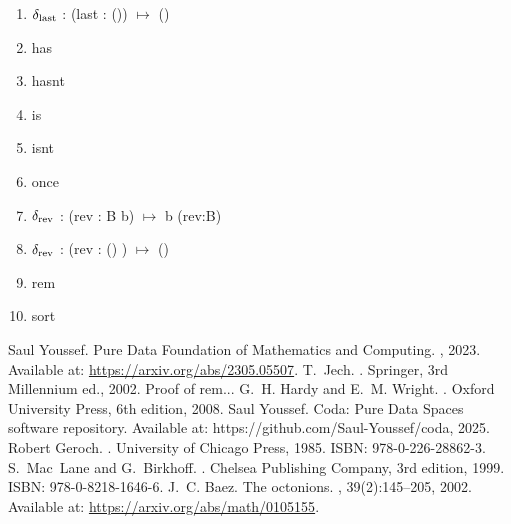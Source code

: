 \documentclass[11pt]{article}
\begin{document}
\begin{enumerate}
{\begin{enumerate}
\item{$\delta_{\rm last}$ : (last : ()) $\mapsto$ ()} 
\item{has}
\item{hasnt}
\item{is}
\item{isnt} 
\item{once} 
\item{$\delta_{\rm rev}$ : (rev : B b) $\mapsto$ b (rev:B)} 
\item{$\delta_{\rm rev}$ : (rev : () ) $\mapsto$ ()}
\item{rem} 
\item{sort} 
\end{enumerate} 
}
\end{enumerate}

\begin{thebibliography}{1}

Saul Youssef.
\newblock Pure Data Foundation of Mathematics and Computing.
, 2023.
\newblock Available at: \url{https://arxiv.org/abs/2305.05507}.
T.~Jech.
.
\newblock Springer, 3rd Millennium ed., 2002.
Proof of rem...
G.~H. Hardy and E.~M. Wright.
.
\newblock Oxford University Press, 6th edition, 2008.
Saul Youssef.
\newblock Coda: Pure Data Spaces software repository.
\newblock Available at: https://github.com/Saul-Youssef/coda, 2025.
Robert Geroch.
.
\newblock University of Chicago Press, 1985.
\newblock ISBN: 978-0-226-28862-3.
S.~Mac~Lane and G.~Birkhoff.
.
\newblock Chelsea Publishing Company, 3rd edition, 1999.
\newblock ISBN: 978-0-8218-1646-6.
J.~C. Baez.
\newblock The octonions.
, 39(2):145--205, 2002.
\newblock Available at: \url{https://arxiv.org/abs/math/0105155}.
\end{thebibliography}
\end{document}
